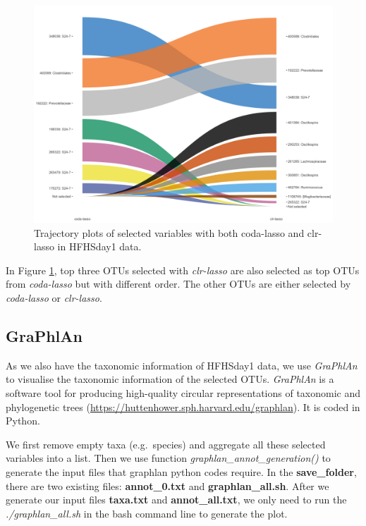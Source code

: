 \documentclass[openany]{book}
\begin{document}
\begin{figure}

{\centering \includegraphics[width=1\linewidth]{./Generated_plots/trajHFHS-1} 

}

\caption{Trajectory plots of selected variables with both coda-lasso and clr-lasso in HFHSday1 data.}\label{fig:trajHFHS}
\end{figure}

In Figure \ref{fig:trajHFHS}, top three OTUs selected with
\emph{clr-lasso} are also selected as top OTUs from \emph{coda-lasso}
but with different order. The other OTUs are either selected by
\emph{coda-lasso} or \emph{clr-lasso}.

\subsection{GraPhlAn}\label{graphlan}

As we also have the taxonomic information of HFHSday1 data, we use
\emph{GraPhlAn} to visualise the taxonomic information of the selected
OTUs. \emph{GraPhlAn} is a software tool for producing high-quality
circular representations of taxonomic and phylogenetic trees
(\url{https://huttenhower.sph.harvard.edu/graphlan}). It is coded in
Python.

We first remove empty taxa (e.g.~species) and aggregate all these
selected variables into a list. Then we use function
\emph{graphlan\_annot\_generation()} to generate the input files that
graphlan python codes require. In the \textbf{save\_folder}, there are
two existing files: \textbf{annot\_0.txt} and \textbf{graphlan\_all.sh}.
After we generate our input files \textbf{taxa.txt} and
\textbf{annot\_all.txt}, we only need to run the
\emph{./graphlan\_all.sh} in the bash command line to generate the plot.
\end{document}
